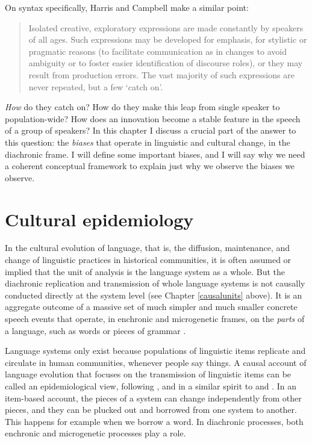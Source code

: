 	On syntax specifically, Harris and Campbell make a similar point:

\begin{quotation}
	Isolated creative, exploratory expressions are made constantly by speakers of all ages. Such expressions may be developed for emphasis, for stylistic or pragmatic reasons (to facilitate communication as in changes to avoid ambiguity or to foster easier identification of discourse roles), or they may result from production errors. The vast majority of such expressions are never repeated, but a few \textquoteleft catch on'. \citep[54]{harris_historical_1995}
\end{quotation}

\textit{How} do they catch on? How do they make this leap from single speaker to population-wide? How does an innovation become a stable feature in the speech of a group of speakers? In this chapter I discuss a crucial part of the answer to this question: the \textit{biases} that operate in linguistic and cultural change, in the diachronic frame. I will define some important biases, and I will say why we need a coherent conceptual framework to explain just why we observe the biases we observe. 


\section{Cultural epidemiology}

In the cultural evolution of language, that is, the diffusion, 
maintenance, and change of linguistic practices in historical 
communities, it is often assumed or implied that the unit of analysis is 
the language system as a whole. But the diachronic replication and transmission of 
whole language systems is not causally conducted directly at the system level (see Chapter \ref{causalunits} above). It 
is an aggregate outcome of a massive set of much simpler and much 
smaller concrete speech events that operate, in enchronic and microgenetic frames, on the \textit{parts} of a language, such as words or pieces of grammar 
\citep{hudson_sociolinguistics_1996}. 



Language systems only exist because populations of linguistic items 
replicate and circulate in human communities, whenever people say things. A causal account of language evolution that focuses on the transmission of linguistic items can be called an 
epidemiological view, following \citet{sperber_anthropology_1985,sperber_explaining_1996}, 
and in a similar spirit to \citet{keller_language_1994} and \citet{croft_explaining_2000}. In an 
item-based account, the pieces of a system 
can change independently from other pieces, and they can be plucked out 
and borrowed from one system to another. This happens for example when we borrow a 
word. In diachronic processes, both enchronic and microgenetic processes play a role.



